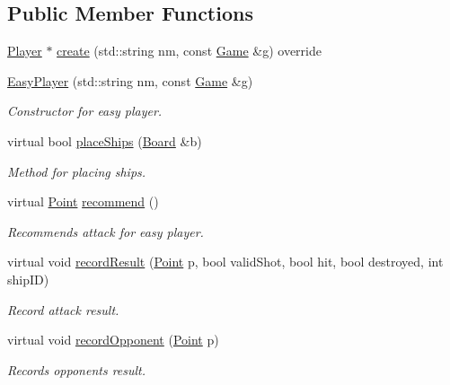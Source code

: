 \subsection*{Public Member Functions}
\begin{DoxyCompactItemize}
\item 
\mbox{\hyperlink{class_player}{Player}} $\ast$ \mbox{\hyperlink{class_easy_player_a5c9837adc8dd76f5bb9e3ee7a576658f}{create}} (std\+::string nm, const \mbox{\hyperlink{class_game}{Game}} \&g) override
\item 
\mbox{\hyperlink{class_easy_player_abf0692676d0bf3c0eb6f6741c621c7ec}{Easy\+Player}} (std\+::string nm, const \mbox{\hyperlink{class_game}{Game}} \&g)
\begin{DoxyCompactList}\small\item\em Constructor for easy player. \end{DoxyCompactList}\item 
virtual bool \mbox{\hyperlink{class_easy_player_a4b9d5815113f393615412f7a98176a6c}{place\+Ships}} (\mbox{\hyperlink{class_board}{Board}} \&b)
\begin{DoxyCompactList}\small\item\em Method for placing ships. \end{DoxyCompactList}\item 
virtual \mbox{\hyperlink{class_point}{Point}} \mbox{\hyperlink{class_easy_player_a9b00f4a9acc74ff688c609bc15bdbb4d}{recommend}} ()
\begin{DoxyCompactList}\small\item\em Recommends attack for easy player. \end{DoxyCompactList}\item 
virtual void \mbox{\hyperlink{class_easy_player_a254a5ddcd421e1dc71e45125e7ab04d8}{record\+Result}} (\mbox{\hyperlink{class_point}{Point}} p, bool valid\+Shot, bool hit, bool destroyed, int ship\+ID)
\begin{DoxyCompactList}\small\item\em Record attack result. \end{DoxyCompactList}\item 
virtual void \mbox{\hyperlink{class_easy_player_a2121149ace67b4a67a5dfa7633738ea3}{record\+Opponent}} (\mbox{\hyperlink{class_point}{Point}} p)
\begin{DoxyCompactList}\small\item\em Records opponent\textquotesingle{}s result. \end{DoxyCompactList}\end{DoxyCompactItemize}


